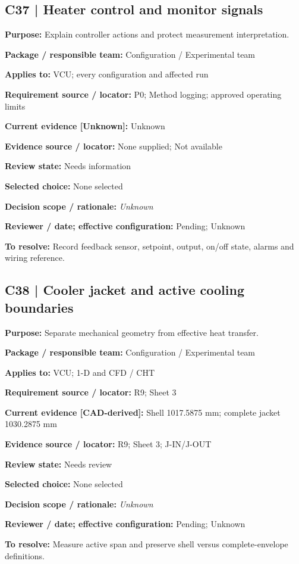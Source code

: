 \documentclass[11pt]{article}
\begin{document}
\begin{minipage}{\textwidth}\small\setlength{\parskip}{2pt}
\subsection*{C37 | Heater control and monitor signals}
\textbf{Purpose:} Explain controller actions and protect measurement interpretation.\par
\textbf{Package / responsible team:} Configuration / Experimental team\par
\textbf{Applies to:} VCU; every configuration and affected run\par
\textbf{Requirement source / locator:} P0; Method logging; approved operating limits\par
\textbf{Current evidence [Unknown]:} Unknown\par
\textbf{Evidence source / locator:} None supplied; Not available\par
\textbf{Review state:} Needs information\par
\textbf{Selected choice:} None selected\par
\textbf{Decision scope / rationale:} \textit{Unknown}\par
\textbf{Reviewer / date; effective configuration:} Pending; Unknown\par
\textbf{To resolve:} Record feedback sensor, setpoint, output, on/off state, alarms and wiring reference.\par
\end{minipage}\par\vspace{5pt}
\begin{minipage}{\textwidth}\small\setlength{\parskip}{2pt}
\subsection*{C38 | Cooler jacket and active cooling boundaries}
\textbf{Purpose:} Separate mechanical geometry from effective heat transfer.\par
\textbf{Package / responsible team:} Configuration / Experimental team\par
\textbf{Applies to:} VCU; 1-D and CFD / CHT\par
\textbf{Requirement source / locator:} R9; Sheet 3\par
\textbf{Current evidence [CAD-derived]:} Shell 1017.5875 mm; complete jacket 1030.2875 mm\par
\textbf{Evidence source / locator:} R9; Sheet 3; J-IN/J-OUT\par
\textbf{Review state:} Needs review\par
\textbf{Selected choice:} None selected\par
\textbf{Decision scope / rationale:} \textit{Unknown}\par
\textbf{Reviewer / date; effective configuration:} Pending; Unknown\par
\textbf{To resolve:} Measure active span and preserve shell versus complete-envelope definitions.\par
\end{minipage}\par\vspace{5pt}
\end{document}
